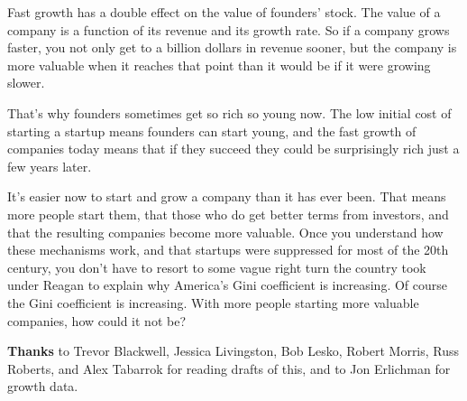 Fast growth has a double effect on the value of founders' stock. The
value of a company is a function of its revenue and its growth rate. So
if a company grows faster, you not only get to a billion dollars in
revenue sooner, but the company is more valuable when it reaches that
point than it would be if it were growing slower.

That's why founders sometimes get so rich so young now. The low initial
cost of starting a startup means founders can start young, and the fast
growth of companies today means that if they succeed they could be
surprisingly rich just a few years later.

It's easier now to start and grow a company than it has ever been. That
means more people start them, that those who do get better terms from
investors, and that the resulting companies become more valuable. Once
you understand how these mechanisms work, and that startups were
suppressed for most of the 20th century, you don't have to resort to
some vague right turn the country took under Reagan to explain why
America's Gini coefficient is increasing. Of course the Gini coefficient
is increasing. With more people starting more valuable companies, how
could it not be?


\textbf{Thanks} to Trevor Blackwell, Jessica Livingston, Bob Lesko,
Robert Morris, Russ Roberts, and Alex Tabarrok for reading drafts of
this, and to Jon Erlichman for growth data.